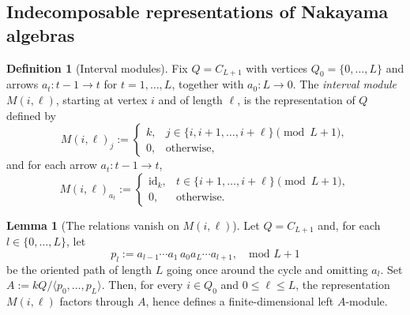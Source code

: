 \documentclass{article}
\theoremstyle{definition}
\newtheorem{lemma}[theorem]{Lemma}
\newtheorem{definition}[theorem]{Definition}
\begin{document}
\subsection{Indecomposable representations of Nakayama algebras}
\begin{definition}[Interval modules]\label{def:interval-modules}
Fix $Q=C_{L+1}$ with vertices $Q_0=\{0,\dots,L\}$ and arrows $a_t:t-1\to t$
for $t=1,\dots,L$, together with $a_0:L\to 0$.
\noindent
The \emph{interval module} $M(i,\ell)$, starting at vertex $i$ and of length $\ell$,
is the representation of $Q$ defined by
\[
M(i,\ell)_j :=
\begin{cases}
k, & j\in\{i,i+1,\dots,i+\ell\}\pmod{L+1},\\
0, & \text{otherwise},
\end{cases}
\]
and for each arrow $a_t:t-1\to t$,
\[
M(i,\ell)_{a_t}:=
\begin{cases}
\mathrm{id}_k, & t\in\{i+1,\dots,i+\ell\}\pmod{L+1},\\
0, & \text{otherwise}.
\end{cases}
\]
\end{definition}

\begin{lemma}[The relations vanish on $M(i,\ell)$]\label{lem:Miell-well-defined}
Let $Q=C_{L+1}$ and, for each $l\in\{0,\dots,L\}$, let
\[
p_l := a_{l-1}\cdots a_1\, a_{0}a_L\cdots a_{l+1}, \quad \text{mod } L+1
\]
be the oriented path of length $L$ going once around the cycle and omitting $a_l$.
Set $A:=kQ/\langle p_0,\dots,p_{L}\rangle$.
Then, for every $i\in Q_0$ and $0\le \ell\le L$, the representation $M(i,\ell)$ factors through $A$, hence defines a finite-dimensional left $A$-module.
\end{lemma}
\end{document}
